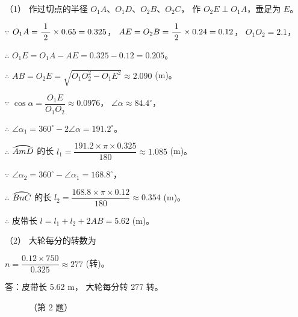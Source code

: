 \begin{enhancedline}
\jie （1） 作过切点的半径 $O_1A$、$O_1D$、$O_2B$、$O_2C$， 作 $O_2E \perp O_1A$，垂足为 $E$。

$\because$ \quad $O_1A = \dfrac{\; 1 \;}{2} \times 0.65 = 0.325$，
    $AE = O_2B = \dfrac{\; 1 \;}{2} \times 0.24 = 0.12$， $O_1O_2 = 2.1$，

$\therefore$ \quad $O_1E = O_1A - AE = 0.325 - 0.12 = 0.205$。

$\therefore$ \quad $AB = O_2E = \sqrt{O_1O_2^2 - O_1E^2} \approx 2.090$ (m)。

$\because$ \quad $\cos\alpha = \dfrac{O_1E}{O_1O_2} \approx 0.0976$， $\angle\alpha \approx 84.4^\circ$，

$\therefore$ \quad $\angle\alpha_1 = 360^\circ - 2 \angle\alpha = 191.2^\circ$。

$\therefore$ \quad $\yuanhu{AmD}$  的长 $l_1 = \dfrac{191.2 \times \pi \times 0.325}{180} \approx 1.085$ (m)。

$\because$ \quad $\angle \alpha_2 = 360^\circ - \angle \alpha_1 = 168.8^\circ$，

$\therefore$ \quad $\yuanhu{BnC}$ 的长 $l_2 = \dfrac{168.8 \times \pi \times 0.12}{180} \approx 0.354$ (m)。

$\therefore$ \quad 皮带长 $l = l_1 + l_2 + 2 AB = 5.62$ (m)。

（2） 大轮每分的转数为

\qquad $n = \dfrac{0.12 \times 750}{0.325} \approx 277$ (转)。

答：皮带长 5.62 m， 大轮每分转 277 转。

\begin{figure}[htbp]
    \centering
    \begin{minipage}[b]{10.5cm}
        \centering
        
        \caption{}\label{fig:czjh2-7-76}
    \end{minipage}
    \begin{minipage}[b]{5cm}
        \centering
        
        \caption*{（第 2 题）}
    \end{minipage}
\end{figure}


\begin{lianxi}



\end{lianxi}

\end{enhancedline}

